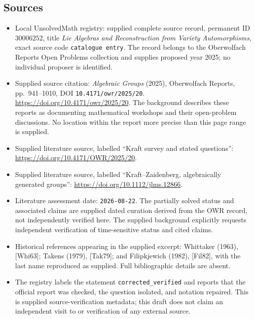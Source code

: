 \documentclass[11pt]{article}
\begin{document}
\subsection{Sources}
\begin{itemize}
\item Local UnsolvedMath registry: supplied complete source record, permanent ID \(30006252\), title \emph{Lie Algebras and Reconstruction from Variety Automorphisms}, exact source code \texttt{catalogue entry}. The record belongs to the Oberwolfach Reports Open Problems collection and supplies proposed year 2025; no individual proposer is identified.
\item Supplied source citation: \emph{Algebraic Groups} (2025), Oberwolfach Reports, pp.\ 941--1010, DOI \texttt{10.4171/owr/2025/20}. \url{https://doi.org/10.4171/owr/2025/20}. The background describes these reports as documenting mathematical workshops and their open-problem discussions. No location within the report more precise than this page range is supplied.
\item Supplied literature source, labelled ``Kraft survey and stated questions'': \url{https://doi.org/10.4171/OWR/2025/20}.
\item Supplied literature source, labelled ``Kraft--Zaidenberg, algebraically generated groups'': \url{https://doi.org/10.1112/jlms.12866}.
\item Literature assessment date: \texttt{2026-08-22}. The partially solved status and associated claims are supplied dated curation derived from the OWR record, not independently verified here. The supplied background explicitly requests independent verification of time-sensitive status and cited claims.
\item Historical references appearing in the supplied excerpt: Whittaker (1963), [Whi63]; Takens (1979), [Tak79]; and Filipkjewich (1982), [Fil82], with the last name reproduced as supplied. Full bibliographic details are absent.
\item The registry labels the statement \texttt{corrected\_verified} and reports that the official report was checked, the question isolated, and notation repaired. This is supplied source-verification metadata; this draft does not claim an independent visit to or verification of any external source.
\end{itemize}
\end{document}
